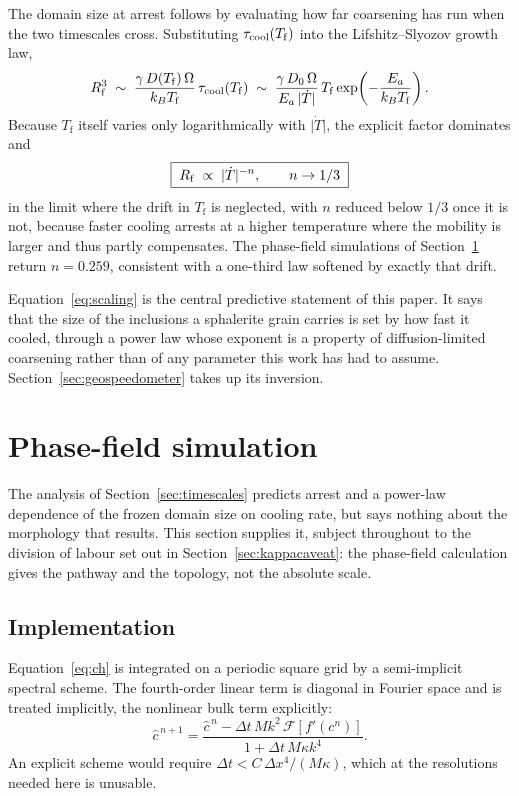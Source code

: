 \documentclass[11pt,a4paper]{article}
\newcommand{\Tf}{T_{\mathrm{f}}}
\begin{document}
The domain size at arrest follows by evaluating how far coarsening has run when
the two timescales cross. Substituting $\tau_{\rm cool}(\Tf)$ into the
Lifshitz--Slyozov growth law,
\begin{equation}
R_{\rm f}^3 \;\sim\; \frac{\gamma\, D(\Tf)\, \Omega}{k_B \Tf}\,
                     \tau_{\rm cool}(\Tf)
             \;\sim\; \frac{\gamma\, D_0\, \Omega}{E_a\, \lvert\dot{T}\rvert}
                      \, \Tf \exp\!\left(-\frac{E_a}{k_B \Tf}\right).
\label{eq:Rf}
\end{equation}
Because $\Tf$ itself varies only logarithmically with $\lvert\dot{T}\rvert$, the
explicit factor dominates and
\begin{equation}
\boxed{\;R_{\rm f} \;\propto\; \lvert\dot{T}\rvert^{-n}, \qquad n \to 1/3 \;}
\label{eq:scaling}
\end{equation}
in the limit where the drift in $\Tf$ is neglected, with $n$ reduced below
$1/3$ once it is not, because faster cooling arrests at a higher temperature
where the mobility is larger and thus partly compensates. The phase-field
simulations of Section~\ref{sec:pf} return $n = 0.259$, consistent with a
one-third law softened by exactly that drift.

Equation~\eqref{eq:scaling} is the central predictive statement of this paper.
It says that the size of the inclusions a sphalerite grain carries is set by how
fast it cooled, through a power law whose exponent is a property of
diffusion-limited coarsening rather than of any parameter this work has had to
assume. Section~\ref{sec:geospeedometer} takes up its inversion.

\section{Phase-field simulation}
\label{sec:pf}

The analysis of Section~\ref{sec:timescales} predicts arrest and a power-law
dependence of the frozen domain size on cooling rate, but says nothing about the
morphology that results. This section supplies it, subject throughout to the
division of labour set out in Section~\ref{sec:kappacaveat}: the phase-field
calculation gives the pathway and the topology, not the absolute scale.

\subsection{Implementation}

Equation~\eqref{eq:ch} is integrated on a periodic square grid by a
semi-implicit spectral scheme. The fourth-order linear term is diagonal in
Fourier space and is treated implicitly, the nonlinear bulk term explicitly:
\begin{equation}
\hat{c}^{\,n+1} = \frac{\hat{c}^{\,n} - \Delta t\, M k^2\,
                        \mathcal{F}\!\left[f'(c^n)\right]}
                       {1 + \Delta t\, M \kappa k^4}.
\label{eq:scheme}
\end{equation}
An explicit scheme would require $\Delta t < C\,\Delta x^4/(M\kappa)$, which at
the resolutions needed here is unusable.
\end{document}
